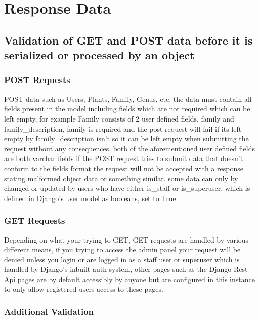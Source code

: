 \documentclass{article}
\begin{document}
    
    \newpage
    
    \section{Response Data}
    
    \subsection{Validation of GET and POST data before it is serialized or processed by an object}
    
     \subsubsection{POST Requests}
      POST data such as Users, Plants, Family, Genus, etc,
      the data must contain all fields present in the model including fields which are not required which can be left empty, for example Family consists of 2 user defined fields, family and family\_description, family is required and the post request will fail if its left empty by family\_description isn't so it can be left empty when submitting the request without any consequences.
      both of the aforementioned user defined fields are both varchar fields if the POST request tries to submit data that doesn't conform to the fields format the request will not be accepted with a response stating malformed object data or something similar. some data can only by changed or updated by users who have either is\_staff or is\_superuser, which is defined in Django's user model as booleans, set to True. 
      
     \subsubsection{GET Requests}
     
     Depending on what your trying to GET, GET requests are handled by various different means, if you trying to access the admin panel your request will be denied unless you login or are logged in as a staff user or superuser which is handled by Django's inbuilt auth system, other pages such as the Django Rest Api pages are by default accessibly by anyone but are configured in this instance to only allow registered users access to these pages.
    
    \subsubsection{Additional Validation}
    
\end{document}
